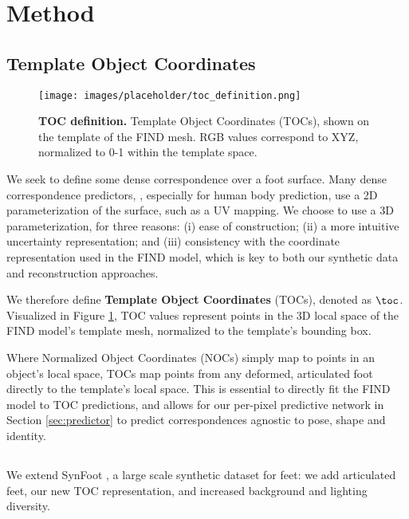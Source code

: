 \section{Method}

\subsection{Template Object Coordinates}

\begin{figure}
    \centering
    \texttt{[image: images/placeholder/toc\_definition.png]}
    \caption{\textbf{TOC definition.} Template Object Coordinates (TOCs), shown on the template of the FIND mesh. RGB values correspond to XYZ, normalized to 0-1 within the template space.}
    \label{fig:toc_definition}
\end{figure}

We seek to define some dense correspondence over a foot surface.
Many dense correspondence predictors, \cite{guler2018densepose, taylor2012vitruvian, zeng20203d}, especially for human body prediction, use a 2D parameterization of the surface, such as a UV mapping. We choose to use a 3D parameterization, for three reasons: (i) ease of construction; (ii) a more intuitive uncertainty representation; and (iii) consistency with the coordinate representation used in the FIND \cite{boyne2022find} model, which is key to both our synthetic data and reconstruction approaches.

We therefore define \textbf{Template Object Coordinates} (TOCs), denoted as $\toc$. Visualized in Figure \ref{fig:toc_definition}, TOC values represent points in the 3D local space of the FIND model's template mesh, normalized to the template's bounding box.

Where Normalized Object Coordinates (NOCs) simply map to points in an object's local space, TOCs map points from any deformed, articulated foot directly to the template's local space. This is essential to directly fit the FIND model to TOC predictions, and allows for our per-pixel predictive network in Section \ref{sec:predictor} to predict correspondences agnostic to pose, shape and identity.

\subsection{\ourSynth}

We extend SynFoot \cite{boyne2024found}, a large scale synthetic dataset for feet: we add articulated feet, our new TOC representation, and increased background and lighting diversity.

